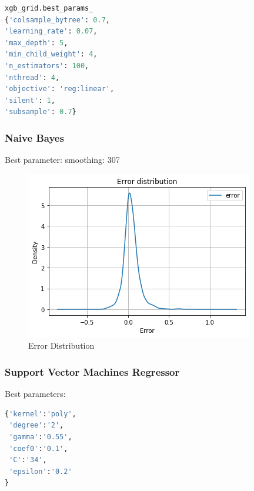 \begin{lstlisting}[language=Python]
xgb_grid.best_params_
{'colsample_bytree': 0.7, 
'learning_rate': 0.07, 
'max_depth': 5, 
'min_child_weight': 4, 
'n_estimators': 100, 
'nthread': 4, 
'objective': 'reg:linear', 
'silent': 1, 
'subsample': 0.7}
\end{lstlisting}


\subsubsection{Naive Bayes}
Best parameter:
smoothing: 307

\begin{figure}
	\centering
	\includegraphics[width=1\linewidth]{Figure/nb_error_distribution.png}
	\caption{Error Distribution} 
	\label{fig:nb1}
\end{figure}

\subsubsection{Support Vector Machines Regressor}
Best parameters:
\begin{lstlisting}[language=Python]
{'kernel':'poly', 
 'degree':'2', 
 'gamma':'0.55', 
 'coef0':'0.1', 
 'C':'34', 
 'epsilon':'0.2'
}
\end{lstlisting}{}

